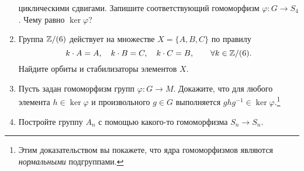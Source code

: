 \begin{enumerate}
        циклическими сдвигами. Запишите соответствующий гомоморфизм $\varphi \colon G \to S_4$.
        Чему равно $\ker \varphi$?
    \item Группа $\mathbb Z / (6)$ действует на множестве $X = \{A, B, C\}$ по правилу
         $$k \cdot A = A, \quad k \cdot B = C, \quad k \cdot C = B, \qquad \forall k \in \mathbb Z / (6).$$
         Найдите орбиты и стабилизаторы элементов $X$.
    \item Пусть задан гомоморфизм групп $\varphi \colon G \to M$. 
        Докажите, что для любого элемента $h \in \ker \varphi$ и произвольного $g \in G$
        выполняется $ghg^{-1} \in \ker \varphi$.\footnote{
        Этим доказательством вы покажете, что ядра гомоморфизмов являются \emph{нормальными} подгруппами.}
    \item Постройте группу $A_n$ с помощью какого-то гомоморфизма $S_n \to S_n.$
\end{enumerate}
